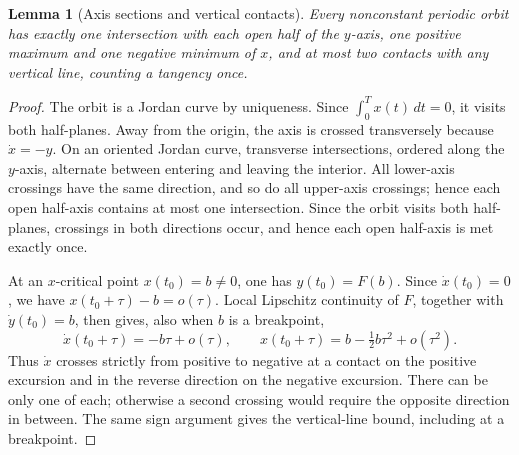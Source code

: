 \documentclass[11pt]{article}
\newtheorem{lemma}[theorem]{Lemma}
\theoremstyle{remark}
\begin{document}
\begin{lemma}[Axis sections and vertical contacts]\label{lem:geometry}
Every nonconstant periodic orbit has exactly one intersection with each
open half of the \(y\)-axis, one positive maximum and one negative minimum
of \(x\), and at most two contacts with any vertical line, counting a
tangency once.
\end{lemma}
\begin{proof}
The orbit is a Jordan curve by uniqueness.  Since
\(\int_0^T x(t)\,dt=0\), it visits both half-planes.  Away from the
origin, the axis is crossed transversely because \(\dot x=-y\).  On an
oriented Jordan curve, transverse intersections, ordered along the
\(y\)-axis, alternate between entering and leaving the interior.
All lower-axis crossings
have the same direction, and so do all upper-axis crossings; hence each
open half-axis contains at most one intersection.  Since the orbit visits
both half-planes, crossings in both directions occur, and hence each open
half-axis is met exactly once.

At an \(x\)-critical point \(x(t_0)=b\ne0\), one has \(y(t_0)=F(b)\).
Since \(\dot x(t_0)=0\), we have \(x(t_0+\tau)-b=o(\tau)\).
Local Lipschitz continuity of \(F\), together with \(\dot y(t_0)=b\),
then gives, also when \(b\) is a breakpoint,
\[
 \dot x(t_0+\tau)=-b\tau+o(\tau),\qquad
 x(t_0+\tau)=b-\tfrac12b\tau^2+o(\tau^2).
\]
Thus \(\dot x\) crosses strictly from positive to negative at a contact
on the positive excursion and in the reverse direction on the negative
excursion.  There can be only
one of each; otherwise a second crossing would require the opposite
direction in between.  The same sign argument gives the vertical-line
bound, including at a breakpoint.
\end{proof}
\end{document}
